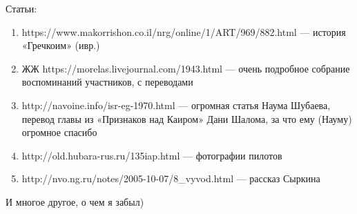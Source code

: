 Статьи:
\begin{enumerate}
	
	\item  https://www.makorrishon.co.il/nrg/online/1/ART/969/882.html — история «Гречкоим» (ивр.)
	
	\item  ЖЖ https://morelas.livejournal.com/1943.html — очень подробное собрание воспоминаний участников, с переводами
	
	\item  http://navoine.info/isr-eg-1970.html — огромная статья Наума Шубаева, перевод главы из «Признаков над Каиром» Дани Шалома, за что ему (Науму) огромное спасибо
	
	\item  http://old.hubara-rus.ru/135iap.html — фотографии пилотов
	
	\item  http://nvo.ng.ru/notes/2005-10-07/8\_vyvod.html — рассказ Сыркина
\end{enumerate}
И многое другое, о чем я забыл)
